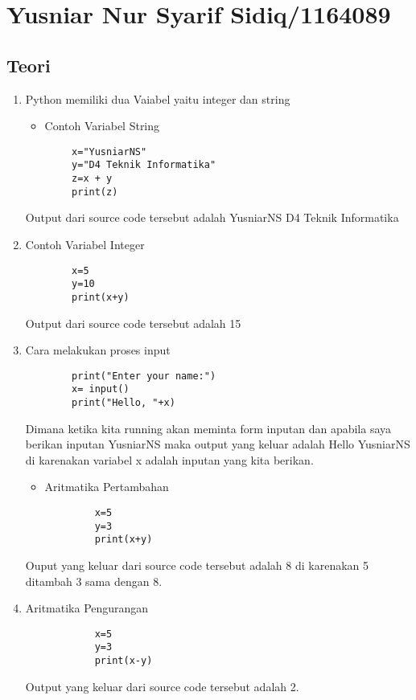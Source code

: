\section{Yusniar Nur Syarif Sidiq/1164089}
\subsection{Teori}

\begin{enumerate}

\item Python memiliki dua Vaiabel yaitu integer dan string
\begin{itemize}
	\item Contoh Variabel String
\end{itemize}
	\begin{verbatim}
		x="YusniarNS"
		y="D4 Teknik Informatika"
		z=x + y
		print(z)
	\end{verbatim}
	\subitem Output dari source code tersebut adalah YusniarNS D4 Teknik Informatika
	\item Contoh Variabel Integer
	\begin{verbatim}
		x=5
		y=10
		print(x+y)
	\end{verbatim}
	\subitem Output dari source code tersebut adalah 15

\par
\item Cara melakukan proses input
	\begin{verbatim}
		print("Enter your name:")
		x= input()
		print("Hello, "+x)
	\end{verbatim}
\subitem Dimana ketika kita running akan meminta form inputan dan apabila saya berikan inputan YusniarNS maka output yang keluar adalah Hello YusniarNS di karenakan variabel x adalah inputan yang kita berikan.
\par
 \begin{itemize}
	\item Aritmatika Pertambahan
\end{itemize}
		\begin{verbatim}
			x=5
			y=3
			print(x+y)
		\end{verbatim}
	\subitem Ouput yang keluar dari source code tersebut adalah 8 di karenakan 5 ditambah 3 sama dengan 8.
	
	\item Aritmatika Pengurangan
		\begin{verbatim}
			x=5
			y=3
			print(x-y)
		\end{verbatim}
	\subitem Output yang keluar dari source code tersebut adalah 2.


\end{enumerate}
